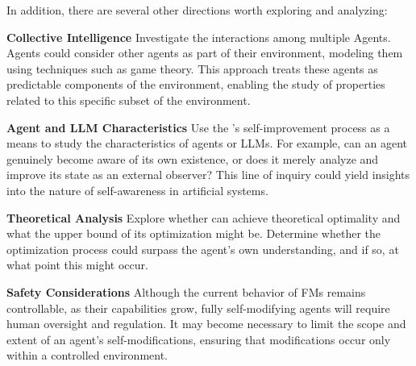 In addition, there are several other directions worth exploring and analyzing:

\noindent\textbf{Collective Intelligence} \quad Investigate the interactions among multiple \godel Agents. Agents could consider other agents as part of their environment, modeling them using techniques such as game theory. This approach treats these agents as predictable components of the environment, enabling the study of properties related to this specific subset of the environment. 

\noindent\textbf{Agent and LLM Characteristics} \quad Use the \framework{}’s self-improvement process as a means to study the characteristics of agents or LLMs. For example, can an agent genuinely become aware of its own existence, or does it merely analyze and improve its state as an external observer? 
This line of inquiry could yield insights into the nature of self-awareness in artificial systems.

\noindent\textbf{Theoretical Analysis} \quad Explore whether \framework{} can achieve theoretical optimality and what the upper bound of its optimization might be. Determine whether the optimization process could surpass the agent’s own understanding, and if so, at what point this might occur.

\noindent\textbf{Safety Considerations} \quad Although the current behavior of FMs remains controllable, as their capabilities grow, fully self-modifying agents will require human oversight and regulation. It may become necessary to limit the scope and extent of an agent's self-modifications, ensuring that modifications occur only within a controlled environment.





